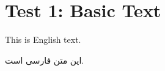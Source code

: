 \documentclass[12pt,a4paper]{article}
\begin{document}
\section*{Test 1: Basic Text}

This is English text.

\textfarsi{این متن فارسی است.}
\end{document}
